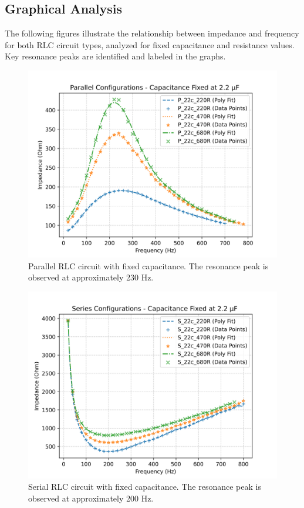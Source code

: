 \documentclass[journal]{IEEEtran}
\begin{document}
\subsection{Graphical Analysis}
The following figures illustrate the relationship between impedance and frequency for both RLC circuit types, analyzed for fixed capacitance and resistance values. Key resonance peaks are identified and labeled in the graphs.

\begin{figure}[H]
    \centering
    \includegraphics[width=\linewidth]{output_plots/Fixed_C/Parallel.png}
    \caption{Parallel RLC circuit with fixed capacitance. The resonance peak is observed at approximately 230 Hz.}
    \label{fig:parallel_fixed_c}
\end{figure}

\begin{figure}[H]
    \centering
    \includegraphics[width=\linewidth]{output_plots/Fixed_C/Series.png}
    \caption{Serial RLC circuit with fixed capacitance. The resonance peak is observed at approximately 200 Hz.}
    \label{fig:series_fixed_c}
\end{figure}
\end{document}
